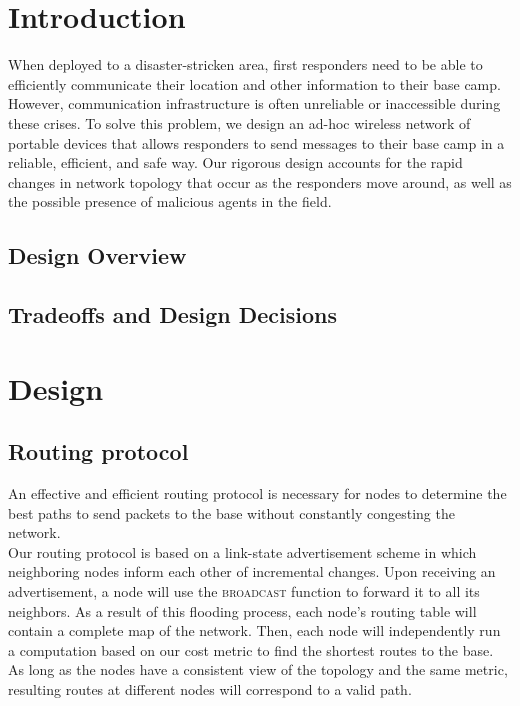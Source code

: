 \documentclass[letterpaper]{article}
\begin{document}
\section{Introduction}

When deployed to a disaster-stricken area, first responders need to be able to efficiently communicate their
location and other information to their base camp. However, communication infrastructure is often unreliable
or inaccessible during these crises. To solve this problem, we design an ad-hoc wireless network of portable
devices that allows responders to send messages to their base camp in a reliable, efficient, and safe way.
Our rigorous design accounts for the rapid changes in network topology that occur as the responders move 
around, as well as the possible presence of malicious agents in the field. 

\subsection{Design Overview}

\subsection{Tradeoffs and Design Decisions}

\section{Design}

\subsection{Routing protocol}

An effective and efficient routing protocol is necessary for nodes to determine the best paths to send
packets to the base without constantly congesting the network.
\\

\noindent Our routing protocol is based on a link-state advertisement scheme in which neighboring nodes 
inform each other of incremental changes. Upon receiving an advertisement, a node will use the 
\textsc{broadcast} function to forward it to all its neighbors. As a result of this flooding process,
each node's routing table will contain a complete map of the network. Then, each node will independently
run a computation based on our cost metric to find the shortest routes to the base. As long as the nodes
have a consistent view of the topology and the same metric, resulting routes at different nodes will
correspond to a valid path.
\\
\end{document}
